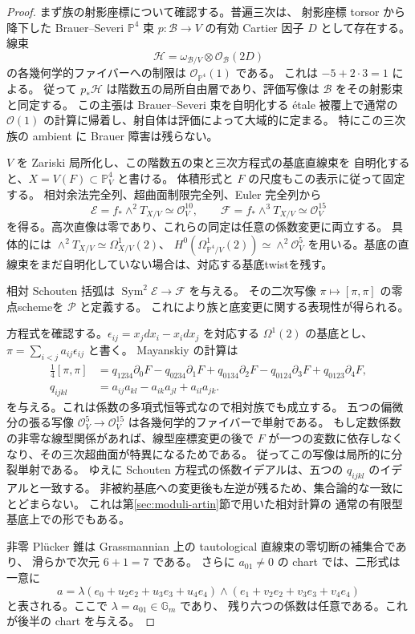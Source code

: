\begin{proof}
まず族の射影座標について確認する。普遍三次は、
射影座標 torsor から降下した Brauer--Severi $\mathbb P^4$ 束
$p:\mathcal B\to V$ の有効 Cartier 因子 $D$ として存在する。
線束
\[
 \mathcal H=\omega_{\mathcal B/V}\otimes\mathcal O_{\mathcal B}(2D)
\]
の各幾何学的ファイバーへの制限は $\mathcal O_{\mathbb P^4}(1)$ である。
これは $-5+2\cdot3=1$ による。
従って $p_*\mathcal H$ は階数五の局所自由層であり、評価写像は
$\mathcal B$ をその射影束と同定する。
この主張は Brauer--Severi 束を自明化する étale 被覆上で通常の
$\mathcal O(1)$ の計算に帰着し、射自体は評価によって大域的に定まる。
特にこの三次族の ambient に Brauer 障害は残らない。

$V$ を Zariski 局所化し、この階数五の束と三次方程式の基底直線束を
自明化すると、$X=V(F)\subset\mathbb P^4_V$ と書ける。
体積形式と $F$ の尺度もこの表示に従って固定する。
相対余法完全列、超曲面制限完全列、Euler 完全列から
\[
 \mathcal E=f_*\wedge^2T_{X/V}\simeq\mathcal O_V^{10},
 \qquad
 \mathcal F=f_*\wedge^3T_{X/V}\simeq\mathcal O_V^{15}
\]
を得る。高次直像は零であり、これらの同定は任意の係数変更に両立する。
具体的には
$\wedge^2T_{X/V}\simeq\Omega^1_{X/V}(2)$、
$H^0(\Omega^1_{\mathbb P^4/V}(2))\simeq\wedge^2\mathcal O_V^5$
を用いる。基底の直線束をまだ自明化していない場合は、対応する基底twistを残す。

相対 Schouten 括弧は $\operatorname{Sym}^2\mathcal E\to\mathcal F$ を与える。
その二次写像 $\pi\mapsto[\pi,\pi]$ の零点schemeを $\mathcal P$ と定義する。
これにより族と底変更に関する表現性が得られる。

方程式を確認する。$\epsilon_{ij}=x_jdx_i-x_idx_j$ を対応する
$\Omega^1(2)$ の基底とし、$\pi=\sum_{i<j}a_{ij}\epsilon_{ij}$ と書く。
Mayanskiy \cite[\S2.2, Lemma~2 and Theorem~1]{Mayanskiy} の計算は
\[
 \begin{aligned}
 \frac14[\pi,\pi]
 &=q_{1234}\partial_0F-q_{0234}\partial_1F
  +q_{0134}\partial_2F-q_{0124}\partial_3F
  +q_{0123}\partial_4F,\\
 q_{ijkl}&=a_{ij}a_{kl}-a_{ik}a_{jl}+a_{il}a_{jk}.
 \end{aligned}
\]
を与える。これは係数の多項式恒等式なので相対族でも成立する。
五つの偏微分の張る写像
$\mathcal O_V^5\to\mathcal O_V^{15}$ は各幾何学的ファイバーで単射である。
もし定数係数の非零な線型関係があれば、線型座標変更の後で
$F$ が一つの変数に依存しなくなり、その三次超曲面が特異になるためである。
従ってこの写像は局所的に分裂単射である。
ゆえに Schouten 方程式の係数イデアルは、五つの $q_{ijkl}$ のイデアルと一致する。
非被約基底への変更後も左逆が残るため、集合論的な一致にとどまらない。
これは第\ref{sec:moduli-artin}節で用いた相対計算の
通常の有限型基底上での形でもある。

非零 Pl\"ucker 錐は Grassmannian 上の tautological 直線束の零切断の補集合であり、
滑らかで次元 $6+1=7$ である。
さらに $a_{01}\ne0$ の chart では、二形式は一意に
\[
 a=\lambda
 (e_0+u_2e_2+u_3e_3+u_4e_4)
 \wedge
 (e_1+v_2e_2+v_3e_3+v_4e_4)
\]
と表される。ここで $\lambda=a_{01}\in\mathbb G_m$ であり、
残り六つの係数は任意である。これが後半の chart を与える。
\end{proof}

